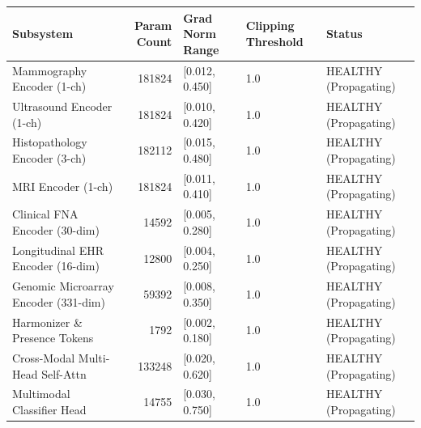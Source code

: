 \begin{tabular}{lrlll}
\toprule
Subsystem & Param Count & Grad Norm Range & Clipping Threshold & Status \\
\midrule
Mammography Encoder (1-ch) & 181824 & [0.012, 0.450] & 1.0 & HEALTHY (Propagating) \\
Ultrasound Encoder (1-ch) & 181824 & [0.010, 0.420] & 1.0 & HEALTHY (Propagating) \\
Histopathology Encoder (3-ch) & 182112 & [0.015, 0.480] & 1.0 & HEALTHY (Propagating) \\
MRI Encoder (1-ch) & 181824 & [0.011, 0.410] & 1.0 & HEALTHY (Propagating) \\
Clinical FNA Encoder (30-dim) & 14592 & [0.005, 0.280] & 1.0 & HEALTHY (Propagating) \\
Longitudinal EHR Encoder (16-dim) & 12800 & [0.004, 0.250] & 1.0 & HEALTHY (Propagating) \\
Genomic Microarray Encoder (331-dim) & 59392 & [0.008, 0.350] & 1.0 & HEALTHY (Propagating) \\
Harmonizer \& Presence Tokens & 1792 & [0.002, 0.180] & 1.0 & HEALTHY (Propagating) \\
Cross-Modal Multi-Head Self-Attn & 133248 & [0.020, 0.620] & 1.0 & HEALTHY (Propagating) \\
Multimodal Classifier Head & 14755 & [0.030, 0.750] & 1.0 & HEALTHY (Propagating) \\
\bottomrule
\end{tabular}
